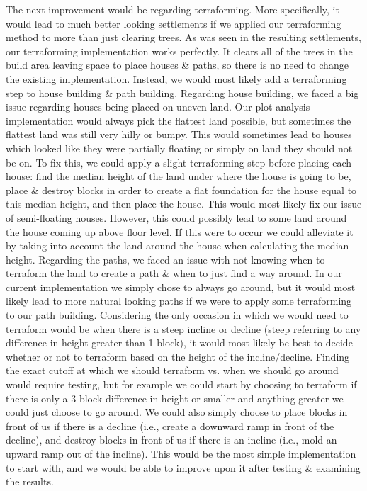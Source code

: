 \documentclass[11pt, oneside]{article}
\begin{document}
\begin{normalsize}
The next improvement would be regarding terraforming. 
More specifically, it would lead to much better looking settlements if we applied our terraforming method to more than just clearing trees. 
As was seen in the resulting settlements, our terraforming implementation works perfectly. 
It clears all of the trees in the build area leaving space to place houses \& paths, so there is no need to change the existing implementation. 
Instead, we would most likely add a terraforming step to house building \& path building. 
Regarding house building, we faced a big issue regarding houses being placed on uneven land. 
Our plot analysis implementation would always pick the flattest land possible, but sometimes the flattest land was still very hilly or bumpy. 
This would sometimes lead to houses which looked like they were partially floating or simply on land they should not be on. 
To fix this, we could apply a slight terraforming step before placing each house: find the median height of the land under where the house is going to be, place \& destroy blocks in order to create a flat foundation for the house equal to this median height, and then place the house. 
This would most likely fix our issue of semi-floating houses. 
However, this could possibly lead to some land around the house coming up above floor level. 
If this were to occur we could alleviate it by taking into account the land around the house when calculating the median height. 
Regarding the paths, we faced an issue with not knowing when to terraform the land to create a path \& when to just find a way around. 
In our current implementation we simply chose to always go around, but it would most likely lead to more natural looking paths if we were to apply some terraforming to our path building. 
Considering the only occasion in which we would need to terraform would be when there is a steep incline or decline (steep referring to any difference in height greater than 1 block), it would most likely be best to decide whether or not to terraform based on the height of the incline/decline. 
Finding the exact cutoff at which we should terraform vs. when we should go around would require testing, but for example we could start by choosing to terraform if there is only a 3 block difference in height or smaller and anything greater we could just choose to go around. 
We could also simply choose to place blocks in front of us if there is a decline (i.e., create a downward ramp in front of the decline), and destroy blocks in front of us if there is an incline (i.e., mold an upward ramp out of the incline). 
This would be the most simple implementation to start with, and we would be able to improve upon it after testing \& examining the results. 


\end{normalsize}
\end{document}
